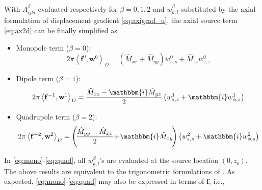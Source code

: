 \documentclass[extra]{gji}
\begin{document}
With $\Lambda_{ijkl}^\beta$ evaluated respectively for $\beta=0,1,2$ and 
$w_{k;l}^\beta$ substituted by the axial formulation of displacement 
gradient \eqref{eq:axigrad_u}, the axial source term
\eqref{eq:ax2d} can be finally simplified as 
\begin{itemize}
  \item Monopole term ($\beta=0$):
  \begin{equation} 
    2\pi \left\langle \mathbf{f}^{0},\mathbf{w}^0 \right\rangle _{D}=
    \left(\hat{M}_{xx}+\hat{M}_{yy}\right)w_{s,s}^0+\hat{M}_{zz}w_{z,z}^0
    \label{eq:mono}
  \end{equation}
  \item Dipole term ($\beta=1$):
  \begin{equation} 
    2\pi \left\langle \mathbf{f}^{-1},\mathbf{w}^1 \right\rangle _{D}=
    \frac{\hat{M}_{xz}-\mathbbm{i}\hat{M}_{yz}}{2} 
    \left(w_{s,z}^1+\mathbbm{i}w_{\phi,z}^1\right)
    \label{eq:di}
  \end{equation}
  \item Quadrupole term ($\beta=2$):
  \begin{equation} 
    2\pi \left\langle \mathbf{f}^{-2},\mathbf{w}^2 \right\rangle _{D}=
    \left(\!\frac{\hat{M}_{yy}-\hat{M}_{xx}}{2}\!+\!\mathbbm{i}\hat{M}_{xy}\!\right) 
    \left(w_{s,s}^2+\mathbbm{i}w_{\phi,s}^2\right)
    \label{eq:quad}
  \end{equation}
\end{itemize}
In \eqref{eq:mono}-\eqref{eq:quad}, all $w_{k,l}^\beta$'s are evaluated at 
the source location $\left(0,z_\text{s}\right)$. 
The above results are equivalent to the trigonometric formulations of 
\cite{nissen2007axisem}.
As expected, \eqref{eq:mono}-\eqref{eq:quad} may also be expressed in terms of 
$\mathbf{f}$, i.e.,
\end{document}
